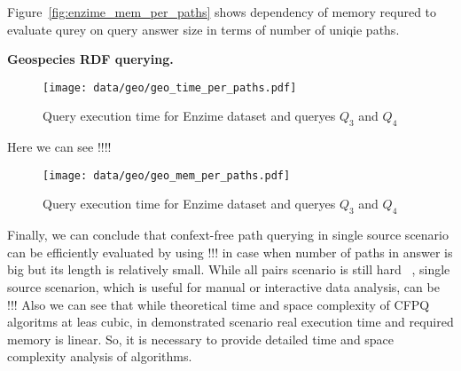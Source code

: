 Figure~\ref{fig:enzime_mem_per_paths} shows dependency of memory requred to evaluate qurey on query answer size in terms of number of uniqie paths.


\textbf{Geospecies RDF querying.}

\begin{figure}[ht]
  \begin{center}
    \texttt{[image: data/geo/geo\_time\_per\_paths.pdf]}
    \caption{Query execution time for Enzime dataset and queryes $Q_3$ and $Q_4$}
    \label{fig:geo_time_per_paths}
  \end{center}
\end{figure}

Here we can see !!!!

\begin{figure}[ht]
  \begin{center}
    \texttt{[image: data/geo/geo\_mem\_per\_paths.pdf]}
    \caption{Query execution time for Enzime dataset and queryes $Q_3$ and $Q_4$}
    \label{fig:geo_time_per_paths}
  \end{center}
\end{figure}

Finally, we can conclude that confext-free path querying in single source scenario can be efficiently evaluated by using !!! in case when number of paths in answer is big but its length is relatively small.
While all pairs scenario is still hard ~\cite{!!!}, single source scenarion, which is useful for manual or interactive data analysis, can be !!!
Also we can see that while theoretical time and space complexity of CFPQ algoritms at leas cubic, in demonstrated scenario real execution time and required memory is linear.
So, it is necessary to provide detailed time and space complexity analysis of algorithms.
